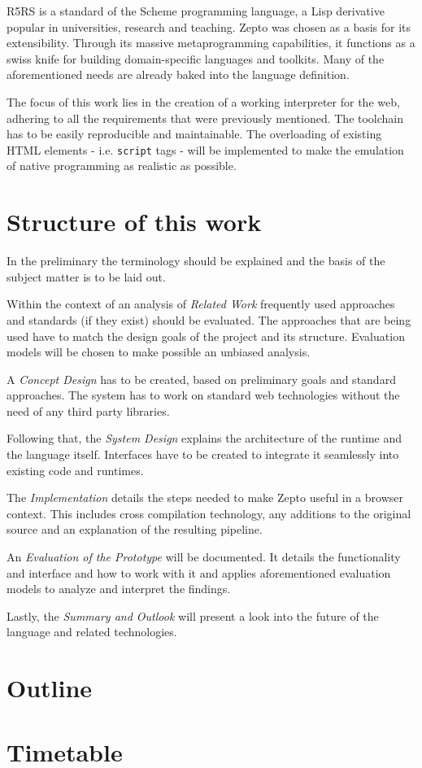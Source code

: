 \documentclass[oneside,11pt,xetex]{scrbook}
\begin{document}
R5RS is a standard of the Scheme programming language, a Lisp derivative popular in universities, research and teaching. Zepto was chosen as a basis for its extensibility. Through its massive metaprogramming capabilities, it functions as a swiss knife for building domain-specific languages and toolkits. Many of the aforementioned needs are already baked into the language definition.

The focus of this work lies in the creation of a working interpreter for the web, adhering to all the requirements that were previously mentioned. The toolchain has to be easily reproducible and maintainable. The overloading of existing HTML elements - i.e. \texttt{script} tags - will be implemented to make the emulation of native programming as realistic as possible.

\clearpage

\section*{Structure of this work}
In the preliminary the terminology should be explained and the basis of the subject matter is to be laid out.

Within the context of an analysis of \emph{Related Work} frequently used approaches and standards (if they exist) should be evaluated. The approaches that are being used have to match the design goals of the project and its structure. Evaluation models will be chosen to make possible an unbiased analysis.

A \emph{Concept Design} has to be created, based on preliminary goals and standard approaches. The system has to work on standard web technologies without the need of any third party libraries.

Following that, the \emph{System Design} explains the architecture of the runtime and the language itself. Interfaces have to be created to integrate it seamlessly into existing code and runtimes.

The \emph{Implementation} details the steps needed to make Zepto useful in a browser context. This includes cross compilation technology, any additions to the original source and an explanation of the resulting pipeline.

An \emph{Evaluation of the Prototype} will be documented. It details the functionality and interface and how to work with it and applies aforementioned evaluation models to analyze and interpret the findings.

Lastly, the \emph{Summary and Outlook} will present a look into the future of the language and related technologies.

\clearpage

\section*{Outline}


\clearpage

\section*{Timetable}


\printbibliography
\end{document}
